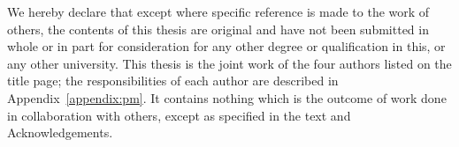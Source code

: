 
\begin{declaration}

We hereby declare that except where specific reference is made to the work of
others, the contents of this thesis are original and have not been submitted in
whole or in part for consideration for any other degree or qualification in
this, or any other university. This thesis is the joint work of the four
authors listed on the title page; the responsibilities of each author are
described in Appendix~\ref{appendix:pm}. It contains nothing which is the
outcome of work done in collaboration with others, except as specified in the
text and Acknowledgements.


\end{declaration}
